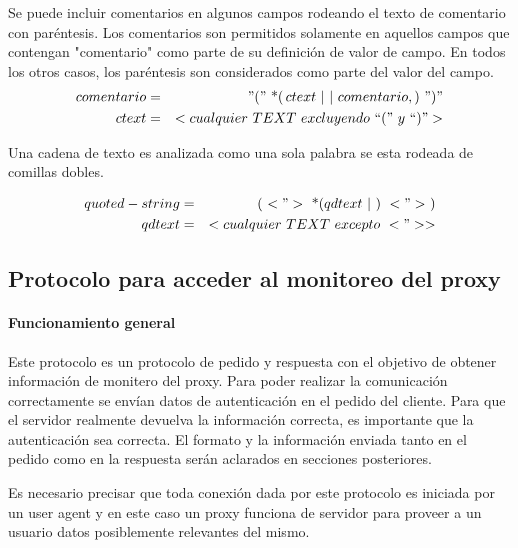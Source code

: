 \documentclass[a4paper,10pt]{article}
\begin{document}
        Se puede incluir comentarios en algunos campos rodeando el texto de comentario con par\'entesis. Los comentarios son permitidos solamente en aquellos campos 
        que contengan "comentario" como parte de su definici\'on de valor de campo. En todos los otros casos, los par\'entesis son considerados como parte del valor del campo.
        \begin{eqnarray*}
            comentario       & = & "("\,\,\text{*}(\,ctext\,\,|\,\,|\,\,comentario,)\,\,")"\nonumber\\
            ctext         & = & <cualquier\,\,TEXT\,\,excluyendo\,\,``("\,\,y\,\,``)">\nonumber\\
        \end{eqnarray*}



        Una cadena de texto es analizada como una sola palabra se esta rodeada de comillas dobles.

        \begin{eqnarray*}
            quoted-string & = & (\,\,<">\,\,\text{*}(qdtext\,\,|\,\,)\,\,<">\,\,)\nonumber\\
            qdtext        & = & <cualquier\,\,TEXT\,\,excepto\,\,<">>\nonumber\\
        \end{eqnarray*}

\newpage

    \subsection{Protocolo para acceder al monitoreo del proxy}

        \paragraph*{Funcionamiento general}

        Este protocolo es un protocolo de pedido y respuesta con el objetivo de obtener informaci\'on 
        de monitero del proxy. Para poder realizar la comunicaci\'on correctamente se env\'ian datos 
        de autenticaci\'on en el pedido del cliente. Para que el servidor realmente devuelva la 
        informaci\'on correcta, es importante que la autenticaci\'on sea correcta. El formato y la 
        informaci\'on enviada tanto en el pedido como en la respuesta ser\'an aclarados en secciones 
        posteriores.

        Es necesario precisar que toda conexi\'on dada por este protocolo es iniciada por un user 
        agent y en este caso un proxy funciona de servidor para proveer a un usuario datos 
        posiblemente relevantes del mismo.
\end{document}
